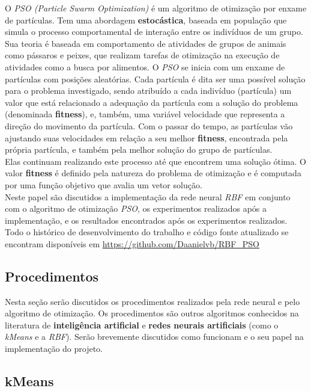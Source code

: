 \documentclass[10pt,twocolumn,letterpaper]{article}
\begin{document}
O \textit{PSO (Particle Swarm Optimization)} é um algoritmo de otimização por enxame de partículas. Tem uma abordagem \textbf{estocástica}, baseada em população que simula o processo comportamental de interação entre os indivíduos de um grupo. Sua teoria é baseada em comportamento de atividades de grupos de animais como pássaros e peixes, que realizam tarefas de otimização na execução de atividades como a busca por alimentos. O \textit{PSO} se inicia com um enxame de partículas com posições aleatórias. Cada partícula é dita ser uma possível solução para o problema investigado, sendo atribuído a cada indivíduo (partícula) um valor que está relacionado a adequação da partícula com a solução do problema (denominada \textbf{fitness}), e, também, uma variável velocidade que representa a direção do movimento da partícula. Com o passar do tempo, as partículas vão ajustando suas velocidades em relação a seu melhor \textbf{fitness}, encontrada pela própria partícula, e também pela melhor solução do grupo de partículas.\\ Elas continuam realizando este processo até que encontrem uma solução ótima. O valor \textbf{fitness} é definido pela natureza do problema de otimização e é computada por uma função objetivo que avalia um vetor solução. \\
Neste papel são discutidos a implementação da rede neural \textit{RBF} em conjunto com o algoritmo de otimização \textit{PSO}, os experimentos realizados após a implementação, e os resultados encontrados após os experimentos realizados. Todo o histórico de desenvolvimento do trabalho e código fonte atualizado se encontram disponíveis em \url{https://github.com/Daanielvb/RBF_PSO}


\subsection{Procedimentos}
Nesta seção serão discutidos os procedimentos realizados pela rede neural e pelo algoritmo de otimização. Os procedimentos são outros algoritmos conhecidos na literatura de \textbf{inteligência artificial} e \textbf{redes neurais artificiais} (como o \textit{kMeans} e a \textit{RBF}). Serão brevemente discutidos como funcionam e o seu papel na implementação do projeto.

\subsection{kMeans}
\end{document}
